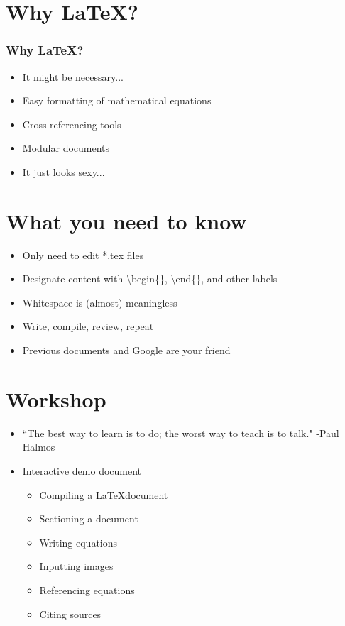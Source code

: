 \documentclass{beamer}
\begin{document}
\section{Why \LaTeX?}
\begin{frame}
	\frametitle{Why \LaTeX?}
    \begin{itemize}
		\item It might be necessary...
        \item Easy formatting of mathematical equations
        \item Cross referencing tools
		\item Modular documents
        \item It just looks sexy...
    \end{itemize}
\end{frame}

\section{What you need to know}
\begin{frame}
	\begin{itemize}
		\item Only need to edit *.tex files
		\item Designate content with \textbackslash begin\{\}, \textbackslash end\{\}, and other labels
		\item Whitespace is (almost) meaningless
		\item Write, compile, review, repeat
		\item Previous documents and Google are your friend
	\end{itemize}
\end{frame}

\section{Workshop}
\begin{frame}
	\begin{itemize}
		\item ``The best way to learn is to do; the worst way to teach is to talk." -Paul Halmos
		\item Interactive demo document
			\begin{itemize}
				\item Compiling a \LaTeX document
				\item Sectioning a document
				\item Writing equations
				\item Inputting images
				\item Referencing equations
				\item Citing sources
			\end{itemize}
	\end{itemize}
\end{frame}



\end{document}
